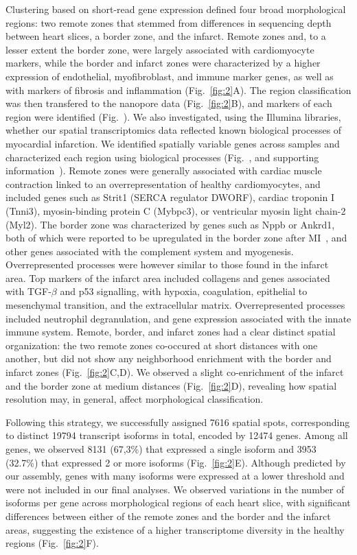 \documentclass[utf8]{FrontiersinHarvard} %
\begin{document}
Clustering based on short-read gene expression defined four broad morphological regions: two remote zones that stemmed from differences in sequencing depth between heart slices, a border zone, and the infarct. 
Remote zones and, to a lesser extent the border zone, were largely associated with cardiomyocyte markers, while the border and infarct zones were characterized by a higher expression of endothelial, myofibroblast, and immune marker genes, as well as with markers of fibrosis and inflammation (Fig.~\ref{fig:2}A).
The region classification was then transfered to the nanopore data (Fig.~\ref{fig:2}B), and markers of each region were identified (Fig.~).
We also investigated, using the Illumina libraries, whether our spatial transcriptomics data reflected known biological processes of myocardial infarction.
We identified spatially variable genes across samples and characterized each region using biological processes (Fig.~, and supporting information~).
Remote zones were generally associated with cardiac muscle contraction linked to an overrepresentation of healthy cardiomyocytes, and included genes such as Strit1 (SERCA regulator DWORF), cardiac troponin I (Tnni3), myosin-binding protein C (Mybpc3), or ventricular myosin light chain-2 (Myl2). 
The border zone was characterized by genes such as Nppb or Ankrd1, both of which were reported to be upregulated in the border zone after MI~\citep{Hama1995:Nppb,Mikhailov2008:Ankrd1}, and other genes associated with the complement system and myogenesis.
Overrepresented processes were however similar to those found in the infarct area.
Top markers of the infarct area included collagens and genes associated with TGF-$\beta$ and p53 signalling, with hypoxia, coagulation, epithelial to mesenchymal transition, and the extracellular matrix.
Overrepresented processes included neutrophil degranulation, and gene expression associated with the innate immune system.
Remote, border, and infarct zones had a clear distinct spatial organization: the two remote zones co-occured at short distances with one another, but did not show any neighborhood enrichment with the border and infarct zones (Fig.~\ref{fig:2}C,D). 
We observed a slight co-enrichment of the infarct and the border zone at medium distances (Fig.~\ref{fig:2}D), revealing how spatial resolution may, in general, affect morphological classification.

Following this strategy, we successfully assigned 7616 spatial spots, corresponding to distinct 19794 transcript isoforms in total, encoded by 12474 genes.
Among all genes, we observed 8131 (67,3\%) that expressed a single isoform and 3953 (32.7\%) that expressed 2 or more isoforms (Fig.~\ref{fig:2}E).
Although predicted by our assembly, genes with many isoforms were expressed at a lower threshold and were not included in our final analyses.
We observed variations in the number of isoforms per gene across morphological regions of each heart slice, with significant differences between either of the remote zones and the border and the infarct areas, suggesting the existence of a higher transcriptome diversity in the healthy regions (Fig.~\ref{fig:2}F). 
\end{document}
